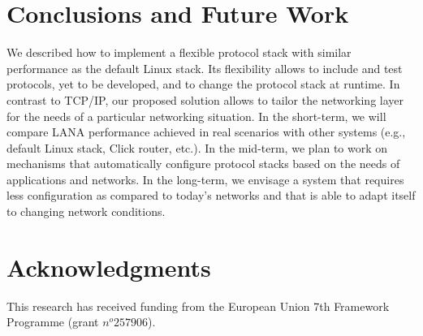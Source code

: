 \documentclass{sig-alternate}
\begin{document}
\section{Conclusions and Future Work}
We described how to implement a flexible protocol stack with similar
performance as the default Linux stack. Its flexibility allows to
include and test protocols, yet to be developed, and to change the protocol
stack at runtime. In contrast to TCP/IP, our proposed solution allows to tailor
the networking layer for the needs of a particular networking situation. In the
short-term, we will compare LANA performance achieved in real scenarios with
other systems (e.g., default Linux stack, Click router, etc.).  In the
mid-term, we plan to work on mechanisms that automatically configure protocol
stacks based on the needs of applications and networks. In the long-term, we
envisage a system that requires less configuration as compared to today's
networks and that is able to adapt itself to changing network conditions.   





\section{Acknowledgments}
This research has received funding from the European Union 7th Framework Programme (grant $n^o 257906$).
%

%
%
\end{document}
